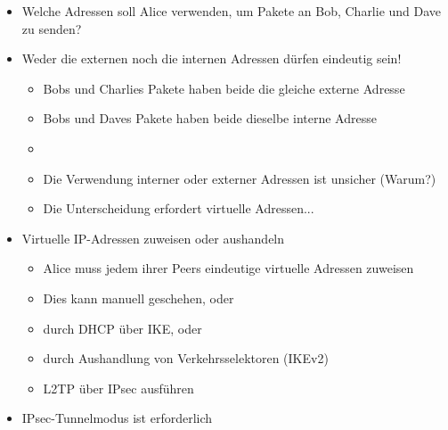 \documentclass[a4paper]{article}
\begin{document}
\begin{multicols}{3}
    \begin{itemize}
        \item
              Welche Adressen soll Alice verwenden, um Pakete an Bob, Charlie und
              Dave zu senden?
        \item
              Weder die externen noch die internen Adressen dürfen eindeutig sein!

              \begin{itemize}
                  \item
                        Bobs und Charlies Pakete haben beide die gleiche externe Adresse
                  \item
                        Bobs und Daves Pakete haben beide dieselbe interne Adresse
                  \item
                  \item
                        Die Verwendung interner oder externer Adressen ist unsicher (Warum?)
                  \item
                        Die Unterscheidung erfordert virtuelle Adressen...
              \end{itemize}
        \item
              Virtuelle IP-Adressen zuweisen oder aushandeln

              \begin{itemize}
                  \item
                        Alice muss jedem ihrer Peers eindeutige virtuelle Adressen zuweisen
                  \item
                        Dies kann manuell geschehen, oder
                  \item
                        durch DHCP über IKE, oder
                  \item
                        durch Aushandlung von Verkehrsselektoren (IKEv2)
                  \item
                        L2TP über IPsec ausführen
              \end{itemize}
        \item
              IPsec-Tunnelmodus ist erforderlich


\end{itemize}
\end{multicols}
\end{document}
